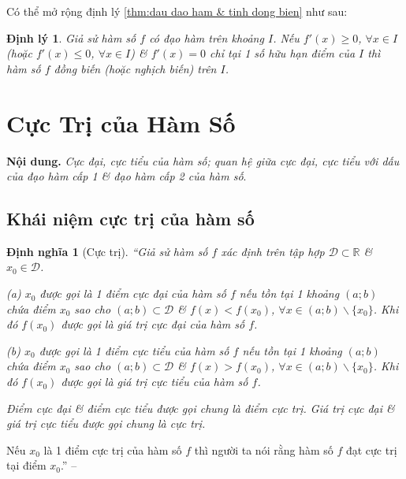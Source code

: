 \documentclass[oneside]{book}
\numberwithin{equation}{section}
\newtheorem{dinhnghia}{Định nghĩa}[section]
\newtheorem{dinhly}{Định lý}[section]
\begin{document}
Có thể mở rộng định lý \ref{thm:dau dao ham & tinh dong bien} như sau:

\begin{dinhly}
	Giả sử hàm số $f$ có đạo hàm trên khoảng $I$. Nếu $f'(x)\ge 0$, $\forall x\in I$ (hoặc $f'(x)\le 0$, $\forall x\in I$) \& $f'(x) = 0$ chỉ tại 1 số hữu hạn điểm của $I$ thì hàm số $f$ đồng biến (hoặc nghịch biến) trên $I$.
\end{dinhly}


\section{Cực Trị của Hàm Số}
\textbf{Nội dung.} \textit{Cực đại, cực tiểu của hàm số; quan hệ giữa cực đại, cực tiểu với dấu của đạo hàm cấp 1 \& đạo hàm cấp 2 của hàm số}.

\subsection{Khái niệm cực trị của hàm số}

\begin{dinhnghia}[Cực trị]
	``Giả sử hàm số $f$ xác định trên tập hợp $\mathcal{D}\subset\mathbb{R}$ \& $x_0\in\mathcal{D}$.
	\begin{enumerate*}
		\item[(a)] $x_0$ được gọi là 1 \emph{điểm cực đại} của hàm số $f$ nếu tồn tại 1 khoảng $(a;b)$ chứa điểm $x_0$ sao cho $(a;b)\subset\mathcal{D}$ \& $f(x) < f(x_0)$, $\forall x\in(a;b)\backslash\{x_0\}$. Khi đó $f(x_0)$ được gọi là \emph{giá trị cực đại} của hàm số $f$.
		\item[(b)] $x_0$ được gọi là 1 \emph{điểm cực tiểu} của hàm số $f$ nếu tồn tại 1 khoảng $(a;b)$ chứa điểm $x_0$ sao cho $(a;b)\subset\mathcal{D}$ \& $f(x) > f(x_0)$, $\forall x\in(a;b)\backslash\{x_0\}$. Khi đó $f(x_0)$ được gọi là \emph{giá trị cực tiểu} của hàm số $f$.
	\end{enumerate*}
	Điểm cực đại \& điểm cực tiểu được gọi chung là \emph{điểm cực trị}. Giá trị cực đại \& giá trị cực tiểu được gọi chung là \emph{cực trị}.
\end{dinhnghia}
Nếu $x_0$ là 1 điểm cực trị của hàm số $f$ thì người ta nói rằng hàm số $f$ đạt cực trị tại điểm $x_0$.'' -- \cite[p. 10]{SGK_Toan_12_giai_tich_nang_cao}
\end{document}
